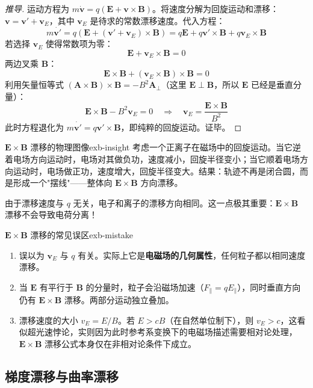 \documentclass[12pt,a4paper,openany,oneside]{book}
\newcommand{\vect}[1]{\bm{#1}}
\begin{document}
\begin{proof}[推导]
运动方程为 $m\dot{\vect{v}} = q(\vect{E} + \vect{v}\times\vect{B})$。将速度分解为回旋运动和漂移：$\vect{v} = \vect{v}' + \vect{v}_E$，其中 $\vect{v}_E$ 是待求的常数漂移速度。代入方程：
\[
m\dot{\vect{v}'} = q(\vect{E} + (\vect{v}' + \vect{v}_E)\times\vect{B}) = q\vect{E} + q\vect{v}'\times\vect{B} + q\vect{v}_E\times\vect{B}
\]
若选择 $\vect{v}_E$ 使得常数项为零：
\[
\vect{E} + \vect{v}_E\times\vect{B} = 0
\]
两边叉乘 $\vect{B}$：
\[
\vect{E}\times\vect{B} + (\vect{v}_E\times\vect{B})\times\vect{B} = 0
\]
利用矢量恒等式 $(\vect{A}\times\vect{B})\times\vect{B} = -B^2\vect{A}_\perp$（这里 $\vect{E}\perp\vect{B}$，所以 $\vect{E}$ 已经是垂直分量）：
\[
\vect{E}\times\vect{B} - B^2\vect{v}_E = 0 \quad\Rightarrow\quad \vect{v}_E = \frac{\vect{E}\times\vect{B}}{B^2}
\]
此时方程退化为 $m\dot{\vect{v}'} = q\vect{v}'\times\vect{B}$，即纯粹的回旋运动。证毕。
\end{proof}

\begin{insight}{$\vect{E}\times\vect{B}$ 漂移的物理图像}{exb-insight}
考虑一个正离子在磁场中的回旋运动。当它逆着电场方向运动时，电场对其做负功，速度减小，回旋半径变小；当它顺着电场方向运动时，电场做正功，速度增大，回旋半径变大。结果：轨迹不再是闭合圆，而是形成一个"摆线"——整体向 $\vect{E}\times\vect{B}$ 方向漂移。

由于漂移速度与 $q$ 无关，电子和离子的漂移方向相同。这一点极其重要：$\vect{E}\times\vect{B}$ 漂移不会导致电荷分离！
\end{insight}

\begin{warning}{$\vect{E}\times\vect{B}$ 漂移的常见误区}{exb-mistake}
\begin{enumerate}
\item 误以为 $\vect{v}_E$ 与 $q$ 有关。实际上它是\textbf{电磁场的几何属性}，任何粒子都以相同速度漂移。
\item 当 $\vect{E}$ 有平行于 $\vect{B}$ 的分量时，粒子会沿磁场加速（$F_\parallel = qE_\parallel$），同时垂直方向仍有 $\vect{E}\times\vect{B}$ 漂移。两部分运动独立叠加。
\item 漂移速度的大小 $v_E = E/B$。若 $E > cB$（在自然单位制下），则 $v_E > c$，这看似超光速悖论，实则因为此时参考系变换下的电磁场描述需要相对论处理，$\vect{E}\times\vect{B}$ 漂移公式本身仅在非相对论条件下成立。
\end{enumerate}
\end{warning}

\subsection{梯度漂移与曲率漂移}
\end{document}
